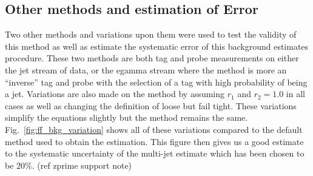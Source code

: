 \subsection{Other methods and estimation of Error}


Two other methods and variations upon them were used to test the validity of this method as well as estimate the systematic error of this background estimates procedure. These two methods are both tag and probe measurements on either the jet stream of data, or the egamma stream where the method is more an ``inverse'' tag and probe with the selection of a tag with high probability of being a jet. Variations are also made on the method by assuming $r_{1}$ and $r_{2} = 1.0$ in all cases as well as changing the definition of loose but fail tight. These variations simplify the equations slightly but the method remains the same. Fig.~\ref{fig:ff_bkg_variation} shows all of these variations compared to the default method used to obtain the estimation. This figure then gives us a good estimate to the systematic uncertainty of the multi-jet estimate which has been chosen to be $20\%$. (ref zprime support note)

